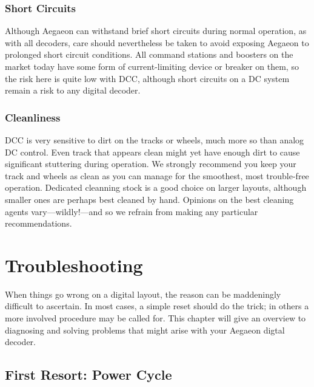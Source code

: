 \documentclass[12pt,letterpaper,draft]{memoir} %
\begin{document}
\subsection{Short Circuits}

Although Aegaeon can withstand brief short circuits during normal operation, as with all decoders, care should nevertheless be taken to avoid exposing Aegaeon to prolonged short circuit conditions. All command stations and boosters on the market today have some form of current-limiting device or breaker on them, so the risk here is quite low with DCC, although short circuits on a DC system remain a risk to any digital decoder.

\subsection{Cleanliness}

DCC is very sensitive to dirt on the tracks or wheels, much more so than analog DC control. Even track that appears clean might yet have enough dirt to cause significant stuttering during operation. We strongly recommend you keep your track and wheels as clean as you can manage for the smoothest, most trouble-free operation. Dedicated cleanning stock is a good choice on larger layouts, although smaller ones are perhaps best cleaned by hand. Opinions on the best cleaning agents vary---wildly!---and so we refrain from making any particular recommendations.

\chapter{Troubleshooting}
\label{troubleshooting}

When things go wrong on a digital layout, the reason can be maddeningly difficult to ascertain. In most cases, a simple reset should do the trick; in others a more involved procedure may be called for. This chapter will give an overview to diagnosing and solving problems that might arise with your Aegaeon digtal decoder.

\section{First Resort: Power Cycle}
\end{document}
